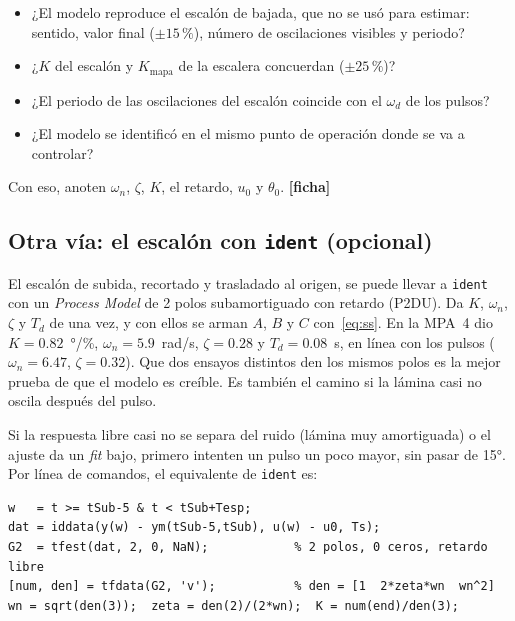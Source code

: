 \documentclass[11pt,letterpaper]{article}
\newcommand{\ficha}{\textcolor{verdeOK}{\textbf{[ficha]}}}  %
\begin{document}
\begin{nota}
\begin{itemize}[leftmargin=12pt]
  \item ¿El modelo reproduce el escalón de bajada, que no se usó para estimar: sentido, valor final ($\pm15\,\%$), número de oscilaciones visibles y periodo?
  \item ¿$K$ del escalón y $K_\text{mapa}$ de la escalera concuerdan ($\pm25\,\%$)?
  \item ¿El periodo de las oscilaciones del escalón coincide con el $\omega_d$ de los pulsos?
  \item ¿El modelo se identificó en el mismo punto de operación donde se va a controlar?
\end{itemize}
Con eso, anoten $\omega_n$, $\zeta$, $K$, el retardo, $u_0$ y $\theta_0$. \ficha
\end{nota}

\subsection{Otra vía: el escalón con \texttt{ident} (opcional)}\label{sec:noosc}

\begin{nota}
El escalón de subida, recortado y trasladado al origen, se puede llevar a \texttt{ident} con un \emph{Process Model} de 2 polos subamortiguado con retardo (P2DU). Da $K$, $\omega_n$, $\zeta$ y $T_d$ de una vez, y con ellos se arman $A$, $B$ y $C$ con~\eqref{eq:ss}. En la MPA~4 dio $K=0.82$~°/\%, $\omega_n=5.9$~rad/s, $\zeta=0.28$ y $T_d=0.08$~s, en línea con los pulsos ($\omega_n=6.47$, $\zeta=0.32$). Que dos ensayos distintos den los mismos polos es la mejor prueba de que el modelo es creíble. Es también el camino si la lámina casi no oscila después del pulso.
\end{nota}


Si la respuesta libre casi no se separa del ruido (lámina muy amortiguada) o el ajuste da un \emph{fit} bajo, primero intenten un pulso un poco mayor, sin pasar de 15°. Por línea de comandos, el equivalente de \texttt{ident} es:

\begin{lstlisting}[caption={Alternativa: dos polos, sin ceros, con retardo estimado.}]
w   = t >= tSub-5 & t < tSub+Tesp;
dat = iddata(y(w) - ym(tSub-5,tSub), u(w) - u0, Ts);
G2  = tfest(dat, 2, 0, NaN);            % 2 polos, 0 ceros, retardo libre
[num, den] = tfdata(G2, 'v');           % den = [1  2*zeta*wn  wn^2]
wn = sqrt(den(3));  zeta = den(2)/(2*wn);  K = num(end)/den(3);
\end{lstlisting}
\end{document}
